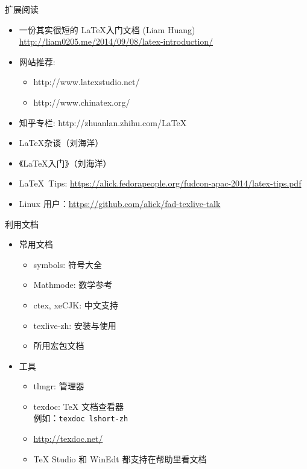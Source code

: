 \begin{frame}{扩展阅读}
  \begin{itemize}
    \item 一份其实很短的 \LaTeX 入门文档 (Liam Huang) \\
      \url{http://liam0205.me/2014/09/08/latex-introduction/} 
    \item 网站推荐: 
      \begin{itemize}
        \item http://www.latexstudio.net/
        \item http://www.chinatex.org/
      \end{itemize}
    \item 知乎专栏: http://zhuanlan.zhihu.com/LaTeX
    \item \LaTeX{}杂谈（刘海洋）
    \item 《\LaTeX{}入门》（刘海洋）
    \item \LaTeX\ Tips:
      \url{https://alick.fedorapeople.org/fudcon-apac-2014/latex-tips.pdf}
    \item Linux 用户：\url{https://github.com/alick/fad-texlive-talk}
  \end{itemize}
\end{frame}


\begin{frame}{利用文档}
  \begin{itemize}
    \item 常用文档
      \begin{itemize}
        \item symbols: 符号大全
        \item Mathmode: 数学参考
        \item ctex, xeCJK: 中文支持
        \item texlive-zh: \TL 安装与使用
        \item 所用宏包文档
      \end{itemize}
    \item 工具
      \begin{itemize}
        \item tlmgr: \TL 管理器
        \item texdoc: \TeX{} 文档查看器\\
          例如：\texttt{texdoc lshort-zh}
        \item \url{http://texdoc.net/}
        \item TeX Studio 和 WinEdt 都支持在帮助里看文档
      \end{itemize}
  \end{itemize}
\end{frame}

